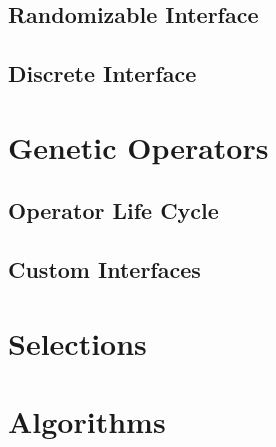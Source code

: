 \todo

\subsection{Randomizable Interface}
\todo

\subsection{Discrete Interface}
\todo

\section{Genetic Operators}
\todo

\subsection{Operator Life Cycle}
\todo

\subsection{Custom Interfaces}
\todo

\section{Selections}
\todo

\section{Algorithms}
\todo

